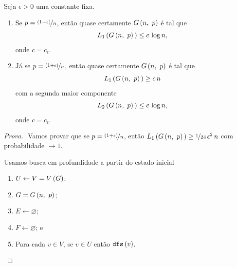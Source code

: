 \begin{teorema}
  Seja $\epsilon>0$ uma constante fixa.
  \begin{enumerate}
    \item Se $p=\nicefrac{\left(1-\epsilon\vphantom{1j}\right)}{n}$, então quase certamente $G\left(n,\ p\vphantom{1j}\right)$ é tal que 
    \[
      L_1\left(G\left(n,\ p\vphantom{1j}\right)\vphantom{1j}\right)\leq c\,\log n,
    \]
    onde $c=c_\epsilon$.
    \item Já se $p=\nicefrac{\left(1+\epsilon\vphantom{1j}\right)}{n}$, então quase certamente $G\left(n,\ p\vphantom{1j}\right)$ é tal que 
    \[
      L_1\left(G\left(n,\ p\vphantom{1j}\right)\vphantom{1j}\right)\geq c\,n
    \]
    com a segunda maior componente
    \[
      L_2\left(G\left(n,\ p\vphantom{1j}\right)\vphantom{1j}\right)\leq c\,\log n,
    \]
    onde $c=c_\epsilon$.
  \end{enumerate}
\end{teorema}

\begin{proof}[Prova]$ $\newline
  Vamos provar que se $p=\nicefrac{\left(1+\epsilon\vphantom{1j}\right)}{n}$, então $L_1\left(G\left(n,\ p\vphantom{1j}\right)\vphantom{1j}\right)\geq\nicefrac{1}{24}\,\epsilon^2\,n$ com probabilidade $\rightarrow1$.

  Usamos busca em profundidade a partir do estado inicial
  \begin{enumerate}
    \item $U\leftarrow V=V\left(G\vphantom{1j}\right)$;
    \item $G=G\left(n,\ p\vphantom{1j}\right)$;
    \item $E\leftarrow\varnothing$;
    \item $F\leftarrow\varnothing$; e
    \item Para cada $v\in V$, se $v\in U$ então $\texttt{dfs}\left(v\vphantom{1j}\right)$.
  \end{enumerate}
\end{proof}

